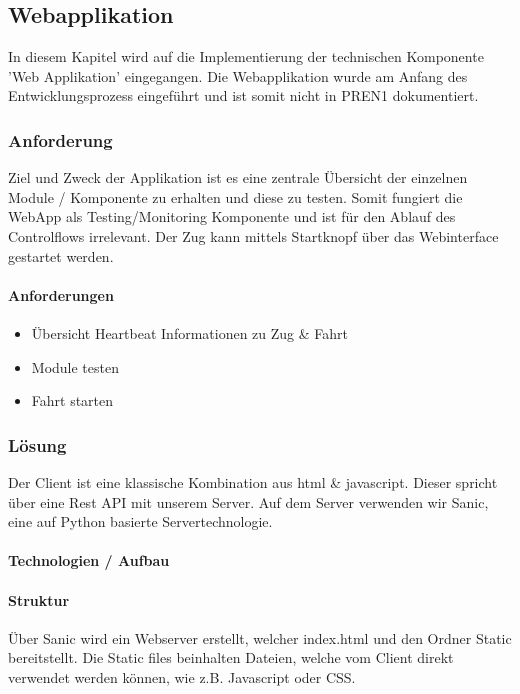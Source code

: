 \documentclass[../../main.tex]{subfiles}
\begin{document}
\subsection{Webapplikation}
In diesem Kapitel wird auf die Implementierung der technischen Komponente 'Web Applikation' eingegangen. Die Webapplikation wurde am Anfang des Entwicklungsprozess eingeführt und ist somit nicht in PREN1 dokumentiert.
\subsubsection{Anforderung}

Ziel und Zweck der Applikation ist es eine zentrale Übersicht der einzelnen Module / Komponente zu erhalten und diese zu testen. Somit fungiert die WebApp als Testing/Monitoring Komponente und ist für den Ablauf des Controlflows irrelevant. Der Zug kann mittels Startknopf über das Webinterface gestartet werden.

\paragraph{Anforderungen}
\begin{itemize}
    \item Übersicht
      \subitem Heartbeat
      \subitem Informationen zu Zug \& Fahrt
    \item Module testen
    \item Fahrt starten
\end{itemize}

\subsubsection{Lösung}
Der Client ist eine klassische Kombination aus html \& javascript. Dieser spricht über eine Rest API mit unserem Server. Auf dem Server verwenden wir Sanic, eine auf Python basierte Servertechnologie.

\paragraph{Technologien / Aufbau}


\paragraph{Struktur}
Über Sanic wird ein Webserver erstellt, welcher index.html und den Ordner Static bereitstellt. Die Static files beinhalten Dateien, welche vom Client direkt verwendet werden können, wie z.B. Javascript oder CSS.
\end{document}
